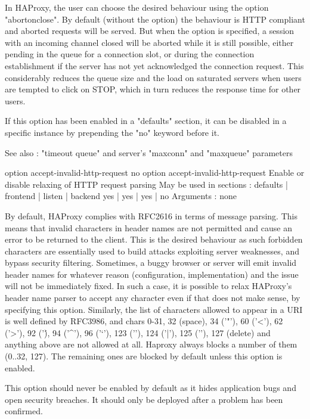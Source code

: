  In HAProxy, the user can choose the desired behaviour using the option
  "abortonclose". By default (without the option) the behaviour is HTTP
  compliant and aborted requests will be served. But when the option is
  specified, a session with an incoming channel closed will be aborted while
  it is still possible, either pending in the queue for a connection slot, or
  during the connection establishment if the server has not yet acknowledged
  the connection request. This considerably reduces the queue size and the load
  on saturated servers when users are tempted to click on STOP, which in turn
  reduces the response time for other users.

  If this option has been enabled in a "defaults" section, it can be disabled
  in a specific instance by prepending the "no" keyword before it.

  See also : "timeout queue" and server's "maxconn" and "maxqueue" parameters


option accept-invalid-http-request
no option accept-invalid-http-request
  Enable or disable relaxing of HTTP request parsing
  May be used in sections :   defaults | frontend | listen | backend
                                 yes   |    yes   |   yes  |   no
  Arguments : none

  By default, HAProxy complies with RFC2616 in terms of message parsing. This
  means that invalid characters in header names are not permitted and cause an
  error to be returned to the client. This is the desired behaviour as such
  forbidden characters are essentially used to build attacks exploiting server
  weaknesses, and bypass security filtering. Sometimes, a buggy browser or
  server will emit invalid header names for whatever reason (configuration,
  implementation) and the issue will not be immediately fixed. In such a case,
  it is possible to relax HAProxy's header name parser to accept any character
  even if that does not make sense, by specifying this option. Similarly, the
  list of characters allowed to appear in a URI is well defined by RFC3986, and
  chars 0-31, 32 (space), 34 ('"'), 60 ('<'), 62 ('>'), 92 ('\'), 94 ('^'), 96
  ('`'), 123 ('{'), 124 ('|'), 125 ('}'), 127 (delete) and anything above are
  not allowed at all. Haproxy always blocks a number of them (0..32, 127). The
  remaining ones are blocked by default unless this option is enabled.

  This option should never be enabled by default as it hides application bugs
  and open security breaches. It should only be deployed after a problem has
  been confirmed.

